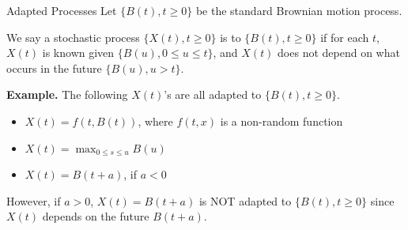 \documentclass[letterpaper,handout]{beamer}
\def\E{\mathbb E}
\def\F{\mathcal{F}}
\begin{document}
%
%
\begin{frame}{Adapted Processes}
Let $\{B(t),t\ge0\}$ be the standard Brownian motion process.\par\medskip

We say a stochastic process $\{X(t),t\ge 0\}$ is  to $\{B(t),t\ge 0\}$
if for each $t$, $X(t)$ is known given $\{B(u),0\le u\le t\}$,
and $X(t)$ does not depend on what occurs in the future $\{B(u), u> t\}$.\bigskip

{\bf Example.} The following $X(t)$'s are all adapted to $\{B(t),t\ge 0\}$.
\begin{itemize}
\item $X(t)=f(t,B(t))$, where $f(t,x)$ is a non-random function
\item $X(t)=\max_{0\le s\le u}B(u)$
\item $X(t)=B(t+a)$, if $a<0$
\end{itemize}
However, if $a>0$, $X(t)=B(t+a)$ is NOT adapted to $\{B(t),t\ge 0\}$ since $X(t)$ depends on the future $B(t+a).$
\end{frame}
\end{document}
